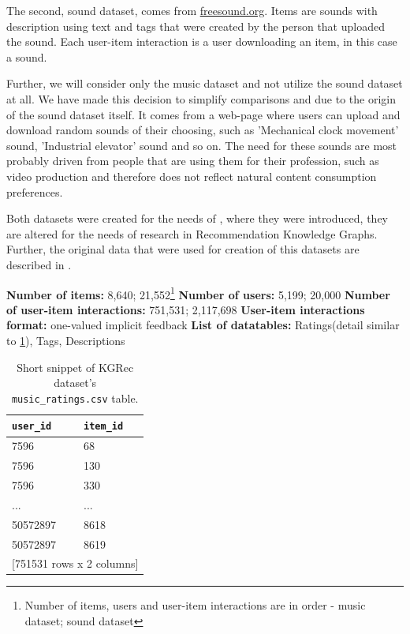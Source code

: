 The second, sound dataset, comes from \href{https://freesound.org/}{freesound.org}. Items are sounds with description using text and tags that were created by the person that uploaded the sound. Each user-item interaction is a user downloading an item, in this case a sound.

Further, we will consider only the music dataset and not utilize the sound dataset at all. We have made this decision to simplify comparisons and due to the origin of the sound dataset itself. It comes from a web-page where users can upload and download random sounds of their choosing, such as 'Mechanical clock movement' sound, 'Industrial elevator' sound and so on. The need for these sounds are most probably driven from people that are using them for their profession, such as video production and therefore does not reflect natural content consumption preferences.

Both datasets were created for the needs of \cite{kgrec_dataset_origin}, where they were introduced, they are altered for the needs of research in Recommendation Knowledge Graphs. Further, the original data that were used for creation of this datasets are described in \cite{kgrec_dataset_origin_full}.


\hfill \break
\noindent
\textbf{Number of items:} 8,640; 21,552\footnote{Number of items, users and user-item interactions are in order - music dataset; sound dataset} \newline
\textbf{Number of users:} 5,199; 20,000 \newline
\textbf{Number of user-item interactions:} 751,531; 2,117,698 \newline
\textbf{User-item interactions format:} one-valued implicit feedback \newline
\textbf{List of datatables:} Ratings(detail similar to \ref{table:5.1_KGRec_ratings}), Tags, Descriptions

\begin{table}[!ht]
    \centering
    \begin{tabular}{ l l }
        \verb|user_id|   & \verb|item_id| \\
        \hline
        7596     &  68  \\
        7596     & 130  \\
        7596     & 330  \\
        ...      & ...  \\
        50572897 & 8618 \\
        50572897 & 8619 \\ [1mm]
        \multicolumn{2}{l}{{[751531 rows x 2 columns]}}
    \end{tabular}
    \caption{Short snippet of KGRec dataset's \texttt{music\_ratings.csv} table.}
    \label{table:5.1_KGRec_ratings}
\end{table}

